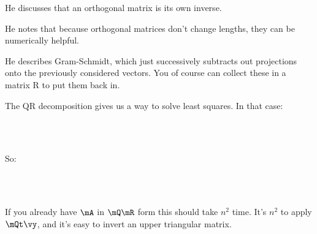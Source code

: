 He discusses that an orthogonal matrix is its own inverse.

He notes that because orthogonal matrices don't change lengths, they
can be numerically helpful.

He describes Gram-Schmidt, which just successively subtracts out
projections onto the previously considered vectors. You of course can
collect these in a matrix R to put them back in.

The QR decomposition gives us a way to solve least squares. In that
case:

\begin{nedqn}
  \parensinv{\mtxAtA}
\eqcol
  \parensinv{
    \parenstrans{\mQ\mR}
    \mQ\mR
   }
\\
\eqcol
  \parensinv{
    \mRt \mQt \mQ \mR
  }
\\
\eqcol
  \parensinv{\mRt\mR}
\end{nedqn}

So:

\begin{nedqn}
  \parensinv{\mAt\mA} \mAt \vy
\eqcol
  \parensinv{\mRt \mR}
  \parenstrans{\mQ\mR}
  \vy
\\
\eqcol
  \mRinv
  \parensinv{\mRt}
  \mRt
  \mQt
  \vy
\\
\eqcol
  \mRinv
  \mQt
  \vy
\end{nedqn}

If you already have $\mA$ in $\mQ\mR$ form this should take $n^2$ time.
It's $n^2$ to apply $\mQt \vy$, and it's easy to invert an upper
triangular matrix.
